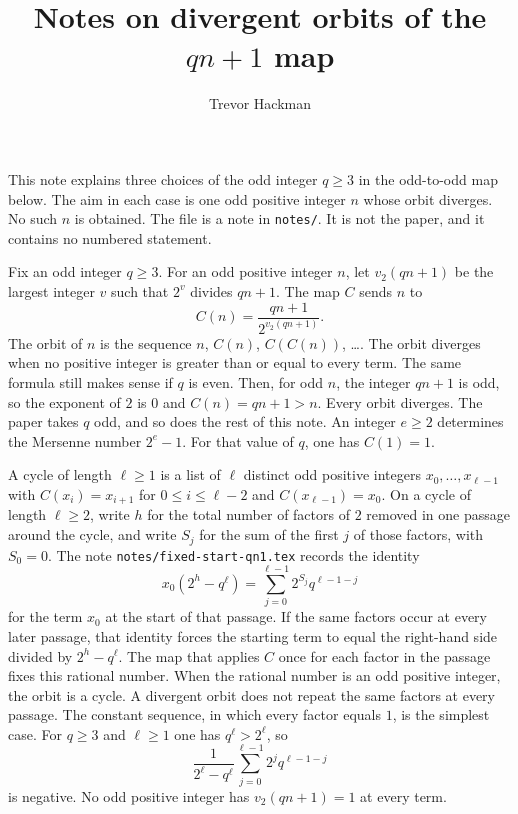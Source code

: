 \documentclass[11pt]{article}
\title{Notes on divergent orbits of the $qn+1$ map}
\author{Trevor Hackman}
\date{}
\begin{document}
\maketitle

This note explains three choices of the odd integer \(q \ge 3\) in the odd-to-odd map below.
The aim in each case is one odd positive integer \(n\) whose orbit diverges.
No such \(n\) is obtained.
The file is a note in \texttt{notes/}.
It is not the paper, and it contains no numbered statement.

Fix an odd integer \(q \ge 3\).
For an odd positive integer \(n\), let \(v_2(qn+1)\) be the largest integer \(v\) such that \(2^v\) divides \(qn+1\).
The map \(C\) sends \(n\) to
\[
C(n) = \frac{qn+1}{2^{v_2(qn+1)}}.
\]
The orbit of \(n\) is the sequence \(n\), \(C(n)\), \(C(C(n))\), \ldots.
The orbit diverges when no positive integer is greater than or equal to every term.
The same formula still makes sense if \(q\) is even.
Then, for odd \(n\), the integer \(qn+1\) is odd, so the exponent of \(2\) is \(0\) and \(C(n) = qn + 1 > n\).
Every orbit diverges.
The paper takes \(q\) odd, and so does the rest of this note.
An integer \(e \ge 2\) determines the Mersenne number \(2^e - 1\).
For that value of \(q\), one has \(C(1) = 1\).

A cycle of length \(\ell \ge 1\) is a list of \(\ell\) distinct odd positive integers \(x_0, \ldots, x_{\ell-1}\) with \(C(x_i) = x_{i+1}\) for \(0 \le i \le \ell-2\) and \(C(x_{\ell-1}) = x_0\).
On a cycle of length \(\ell \ge 2\), write \(h\) for the total number of factors of \(2\) removed in one passage around the cycle, and write \(S_j\) for the sum of the first \(j\) of those factors, with \(S_0 = 0\).
The note \texttt{notes/fixed-start-qn1.tex} records the identity
\[
x_0(2^h - q^\ell) = \sum_{j=0}^{\ell-1} 2^{S_j} q^{\ell-1-j}
\]
for the term \(x_0\) at the start of that passage.
If the same factors occur at every later passage, that identity forces the starting term to equal the right-hand side divided by \(2^h - q^\ell\).
The map that applies \(C\) once for each factor in the passage fixes this rational number.
When the rational number is an odd positive integer, the orbit is a cycle.
A divergent orbit does not repeat the same factors at every passage.
The constant sequence, in which every factor equals \(1\), is the simplest case.
For \(q \ge 3\) and \(\ell \ge 1\) one has \(q^\ell > 2^\ell\), so
\[
\frac{1}{2^\ell - q^\ell}\sum_{j=0}^{\ell-1} 2^{j} q^{\ell-1-j}
\]
is negative.
No odd positive integer has \(v_2(qn+1) = 1\) at every term.
\end{document}
